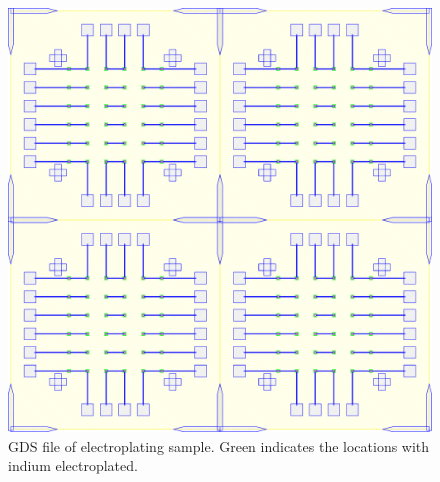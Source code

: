 \begin{figure}
    \centering
    \includegraphics[width=\textwidth]{Main/Ch2/DC_DieBTest_V2.GDStex_output.pdf}
    \caption{GDS file of electroplating sample. Green indicates the locations with indium electroplated. }
\end{figure}


